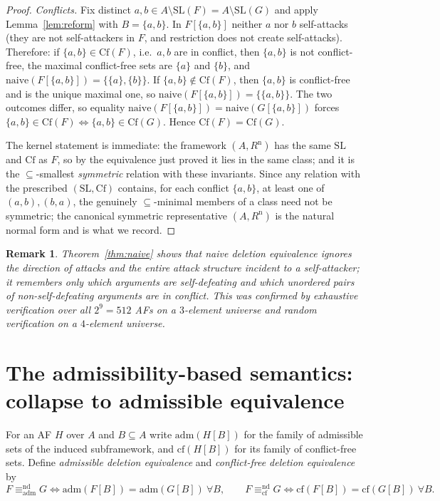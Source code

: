 \documentclass{amsart}
\newtheorem{remark}[theorem]{Remark}
\theoremstyle{remark}
\begin{document}
\begin{proof}
\emph{Conflicts.}  Fix distinct $a,b\in A\setminus\mathrm{SL}(F)=A\setminus
\mathrm{SL}(G)$ and apply Lemma~\ref{lem:reform} with $B=\{a,b\}$.  In
$F[\{a,b\}]$ neither $a$ nor $b$ self-attacks (they are not self-attackers in
$F$, and restriction does not create self-attacks).  Therefore: if
$\{a,b\}\in\mathrm{Cf}(F)$, i.e.\ $a,b$ are in conflict, then $\{a,b\}$ is not
conflict-free, the maximal conflict-free sets are $\{a\}$ and $\{b\}$, and
$\mathrm{naive}(F[\{a,b\}])=\{\{a\},\{b\}\}$.  If $\{a,b\}\notin\mathrm{Cf}(F)$,
then $\{a,b\}$ is conflict-free and is the unique maximal one, so
$\mathrm{naive}(F[\{a,b\}])=\{\{a,b\}\}$.  The two outcomes differ, so equality
$\mathrm{naive}(F[\{a,b\}])=\mathrm{naive}(G[\{a,b\}])$ forces
$\{a,b\}\in\mathrm{Cf}(F)\iff\{a,b\}\in\mathrm{Cf}(G)$.  Hence
$\mathrm{Cf}(F)=\mathrm{Cf}(G)$.

\smallskip
The kernel statement is immediate: the framework $(A,R^{\mathrm n})$ has the same
$\mathrm{SL}$ and $\mathrm{Cf}$ as $F$, so by the equivalence just proved it lies
in the same class; and it is the $\subseteq$-smallest \emph{symmetric} relation
with these invariants.  Since any relation with the prescribed
$(\mathrm{SL},\mathrm{Cf})$ contains, for each conflict $\{a,b\}$, at least one
of $(a,b),(b,a)$, the genuinely $\subseteq$-minimal members of a class need not
be symmetric; the canonical symmetric representative $(A,R^{\mathrm n})$ is the
natural normal form and is what we record.
\end{proof}

\begin{remark}
Theorem~\ref{thm:naive} shows that naive deletion equivalence ignores the
\emph{direction} of attacks and the entire attack structure incident to a
self-attacker; it remembers only \emph{which} arguments are self-defeating and
\emph{which unordered pairs} of non-self-defeating arguments are in conflict.
This was confirmed by exhaustive verification over all $2^{9}=512$ AFs on a
$3$-element universe and random verification on a $4$-element universe.
\end{remark}

\section{The admissibility-based semantics: collapse to admissible
equivalence}\label{sec:adm}

For an AF $H$ over $A$ and $B\subseteq A$ write $\mathrm{adm}(H[B])$ for the
family of admissible sets of the induced subframework, and $\mathrm{cf}(H[B])$
for its family of conflict-free sets.  Define \emph{admissible deletion
equivalence} and \emph{conflict-free deletion equivalence} by
\[
F\equiv^{\mathrm{nd}}_{\mathrm{adm}}G
\iff \mathrm{adm}(F[B])=\mathrm{adm}(G[B])\ \forall B,\qquad
F\equiv^{\mathrm{nd}}_{\mathrm{cf}}G
\iff \mathrm{cf}(F[B])=\mathrm{cf}(G[B])\ \forall B .
\]
\end{document}
